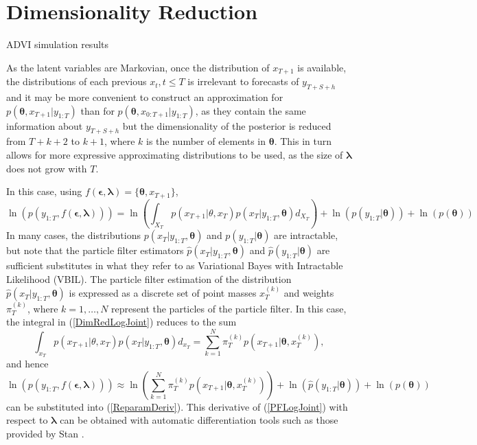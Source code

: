 \documentclass[12pt,a4paper]{article}%
\numberwithin{equation}{section}
\begin{document}
\section{Dimensionality Reduction}

ADVI simulation results

As the latent variables are Markovian, once the distribution of $x_{T+1}$ is available, the distributions of each previous $x_t, t \leq T$ is irrelevant to forecasts of $y_{T+S+h}$ and it may be more convenient to construct an approximation for $p(\boldsymbol{\theta}, x_{T+1} | y_{1:T})$ than for $p(\boldsymbol{\theta}, x_{0:T+1} | y_{1:T})$, as they contain the same information about $y_{T+S+h}$ but the dimensionality of the posterior is reduced from $T+k+2$ to $k+1$, where $k$ is the number of elements in $\boldsymbol{\theta}$. This in turn allows for more expressive approximating distributions to be used, as the size of $\boldsymbol{\lambda}$ does not grow with $T$.

In this case, using $f(\boldsymbol{\epsilon}, \boldsymbol{\lambda}) = \{\boldsymbol{\theta}, x_{T+1}\}$,
\begin{equation}
\label{DimRedLogJoint}
\ln(p(y_{1:T}, f(\boldsymbol{\epsilon}, \boldsymbol{\lambda}))) = \ln\left(\int_{X_T} p(x_{T+1} | \theta, x_T)p(x_T | y_{1:T}, \boldsymbol{\theta})d_{X_T}\right) + \ln(p(y_{1:T} |\boldsymbol{\theta})) + \ln(p(\boldsymbol{\theta}))
\end{equation}
In many cases, the distributions $p(x_T | y_{1:T}, \boldsymbol{\theta})$ and $p(y_{1:T} | \boldsymbol{\theta})$ are intractable, but \citet{TranM2017} note that the particle filter estimators $\hat{p}(x_T | y_{1:T}, \boldsymbol{\theta})$ and $\hat{p}(y_{1:T} | \boldsymbol{\theta})$ are sufficient substitutes in what they refer to as Variational Bayes with Intractable Likelihood (VBIL). The particle filter estimation of the distribution $\hat{p}(x_T | y_{1:T}, \boldsymbol{\theta})$ is expressed as a discrete set of point masses $x_T^{(k)}$ and weights $\pi_T^{(k)}$, where $k = 1, \dots, N$ represent the particles of the particle filter. In this case, the integral in (\ref{DimRedLogJoint}) reduces to the sum
\begin{equation}
\label{ParticleFilterIntegral}
\int_{x_T} p(x_{T+1} | \theta, x_T)p(x_T | y_{1:T}, \boldsymbol{\theta})d_{x_T} = \sum_{k=1}^N \pi_T^{(k)} p(x_{T+1} | \boldsymbol{\theta}, x_T^{(k)}),
\end{equation}
and hence
\begin{equation}
\label{PFLogJoint}
\ln(p(y_{1:T}, f(\boldsymbol{\epsilon}, \boldsymbol{\lambda}))) \approx \ln \left(\sum_{k=1}^N \pi_T^{(k)} p(x_{T+1} | \boldsymbol{\theta}, x_T^{(k)})\right) + \ln(\hat{p}(y_{1:T} |\boldsymbol{\theta})) + \ln(p(\boldsymbol{\theta}))
\end{equation}
can be substituted into (\ref{ReparamDeriv}). This derivative of (\ref{PFLogJoint}) with respect to $\boldsymbol{\lambda}$ can be obtained with automatic differentiation tools such as those provided by Stan \citep{Carpenter2015}.
\end{document}
